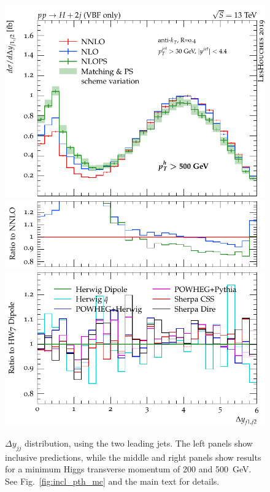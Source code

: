 \documentclass[10pt,prd,fleqn,superscriptaddress,notitlepage,nofootinbib,preprintnumbers,nobalancelastpage]{revtex4-1}
\begin{document}
\begin{figure}[tp]
\begin{minipage}{.32\textwidth}
    \includegraphics[width=\textwidth]{figures/tools/delta_y_jj12_pth500.pdf}
    \includegraphics[width=\textwidth]{figures/tools/delta_y_jj12_pth500_rFO.pdf}
    \includegraphics[width=\textwidth]{figures/tools/delta_y_jj12_pth500_rMC.pdf}
  \end{minipage}
\caption{$\Delta y_{jj}$ distribution, using the two leading jets.
The left panels show inclusive predictions, while the middle and right panels
show results for a minimum Higgs transverse momentum of 200 and 500~GeV.
See Fig.~\ref{fig:incl_pth_mc} and the main text for details.}
\label{fig:incl_delta_y_jj12_mc}
\end{figure}
\end{document}
